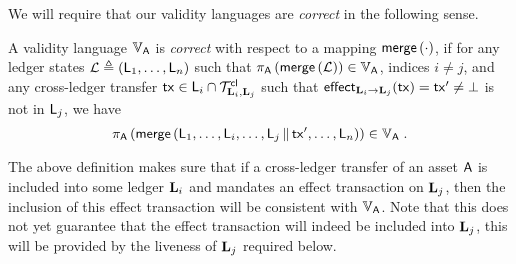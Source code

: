 


We will require that our validity languages are \emph{correct} in the following
sense.

\begin{definition}
  \label{def:correctness}
  A validity language $\ValLang_{\Asset}$ is \emph{correct}
  with respect to
      a mapping $\merge\left(\cdot\right)$,
if
  for any ledger states
  $\mathcal{L}\defeq(\LState_1, \ldots, \LState_n)$
  such that
  $
    \proj_{\Asset}\left(
      \merge\left(
       \mathcal{L}
      \right)
    \right)
    \in \ValLang_{\Asset}
  $,
indices $i \neq j$,
and any cross-ledger transfer %
$\tx\in\LState_i\cap\Trans_{\Ledger_i,\Ledger_j}^\cl$
such that  %
  $\eff{\Ledger_i}{\Ledger_j}(\tx)=\tx'\neq\noeffect$
  is not in $\LState_j$,
we have
$$
  \proj_{\Asset}\left(
    \merge\left(
      \LState_1, \ldots, \LState_i, \ldots,
      \LState_j\concat\tx',
      \ldots, \LState_n
      \right)
  \right)
\in \ValLang_{\Asset}
\; .
$$
\end{definition}

The above definition makes sure that if a cross-ledger transfer of an asset
$\Asset$  is included into
some ledger $\Ledger_i$ and mandates an effect transaction on $\Ledger_j$, then
the inclusion of this effect transaction will be consistent with
$\ValLang_\Asset$. Note that this does not yet guarantee that the effect
transaction will indeed be included into $\Ledger_j$, this will be provided by
the liveness of $\Ledger_j$ required below.

